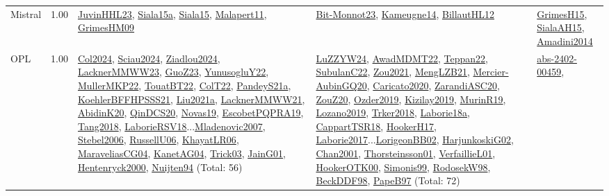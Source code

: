 {\begin{longtable}{p{3cm}r>{\raggedright\arraybackslash}p{6cm}>{\raggedright\arraybackslash}p{6cm}>{\raggedright\arraybackslash}p{8cm}}
\index{Mistral}\index{CPSystems!Mistral}Mistral &  1.00 & \hyperref[detail:JuvinHHL23]{JuvinHHL23}, \hyperref[detail:Siala15a]{Siala15a}, \hyperref[detail:Siala15]{Siala15}, \hyperref[detail:Malapert11]{Malapert11}, \hyperref[detail:GrimesHM09]{GrimesHM09} & \hyperref[detail:Bit-Monnot23]{Bit-Monnot23}, \hyperref[detail:Kameugne14]{Kameugne14}, \hyperref[detail:BillautHL12]{BillautHL12} & \hyperref[detail:GrimesH15]{GrimesH15}, \hyperref[detail:SialaAH15]{SialaAH15}, \hyperref[detail:Amadini2014]{Amadini2014}\\
\index{OPL}\index{CPSystems!OPL}OPL &  1.00 & \hyperref[detail:Col2024]{Col2024}, \hyperref[detail:Sciau2024]{Sciau2024}, \hyperref[detail:Ziadlou2024]{Ziadlou2024}, \hyperref[detail:LacknerMMWW23]{LacknerMMWW23}, \hyperref[detail:GuoZ23]{GuoZ23}, \hyperref[detail:YunusogluY22]{YunusogluY22}, \hyperref[detail:MullerMKP22]{MullerMKP22}, \hyperref[detail:TouatBT22]{TouatBT22}, \hyperref[detail:ColT22]{ColT22}, \hyperref[detail:PandeyS21a]{PandeyS21a}, \hyperref[detail:KoehlerBFFHPSSS21]{KoehlerBFFHPSSS21}, \hyperref[detail:Liu2021a]{Liu2021a}, \hyperref[detail:LacknerMMWW21]{LacknerMMWW21}, \hyperref[detail:AbidinK20]{AbidinK20}, \hyperref[detail:QinDCS20]{QinDCS20}, \hyperref[detail:Novas19]{Novas19}, \hyperref[detail:EscobetPQPRA19]{EscobetPQPRA19}, \hyperref[detail:Tang2018]{Tang2018}, \hyperref[detail:LaborieRSV18]{LaborieRSV18}...\hyperref[detail:Mladenovic2007]{Mladenovic2007}, \hyperref[detail:Stebel2006]{Stebel2006}, \hyperref[detail:RussellU06]{RussellU06}, \hyperref[detail:KhayatLR06]{KhayatLR06}, \hyperref[detail:MaraveliasCG04]{MaraveliasCG04}, \hyperref[detail:KanetAG04]{KanetAG04}, \hyperref[detail:Trick03]{Trick03}, \hyperref[detail:JainG01]{JainG01}, \hyperref[detail:Hentenryck2000]{Hentenryck2000}, \hyperref[detail:Nuijten94]{Nuijten94} (Total: 56) & \hyperref[detail:LuZZYW24]{LuZZYW24}, \hyperref[detail:AwadMDMT22]{AwadMDMT22}, \hyperref[detail:Teppan22]{Teppan22}, \hyperref[detail:SubulanC22]{SubulanC22}, \hyperref[detail:Zou2021]{Zou2021}, \hyperref[detail:MengLZB21]{MengLZB21}, \hyperref[detail:Mercier-AubinGQ20]{Mercier-AubinGQ20}, \hyperref[detail:Caricato2020]{Caricato2020}, \hyperref[detail:ZarandiASC20]{ZarandiASC20}, \hyperref[detail:ZouZ20]{ZouZ20}, \hyperref[detail:Ozder2019]{Ozder2019}, \hyperref[detail:Kizilay2019]{Kizilay2019}, \hyperref[detail:MurinR19]{MurinR19}, \hyperref[detail:Lozano2019]{Lozano2019}, \hyperref[detail:Trker2018]{Trker2018}, \hyperref[detail:Laborie18a]{Laborie18a}, \hyperref[detail:CappartTSR18]{CappartTSR18}, \hyperref[detail:HookerH17]{HookerH17}, \hyperref[detail:Laborie2017]{Laborie2017}...\hyperref[detail:LorigeonBB02]{LorigeonBB02}, \hyperref[detail:HarjunkoskiG02]{HarjunkoskiG02}, \hyperref[detail:Chan2001]{Chan2001}, \hyperref[detail:Thorsteinsson01]{Thorsteinsson01}, \hyperref[detail:VerfaillieL01]{VerfaillieL01}, \hyperref[detail:HookerOTK00]{HookerOTK00}, \hyperref[detail:Simonis99]{Simonis99}, \hyperref[detail:RodosekW98]{RodosekW98}, \hyperref[detail:BeckDDF98]{BeckDDF98}, \hyperref[detail:PapeB97]{PapeB97} (Total: 72) & \hyperref[detail:abs-2402-00459]{abs-2402-00459}, 
\end{longtable}}

